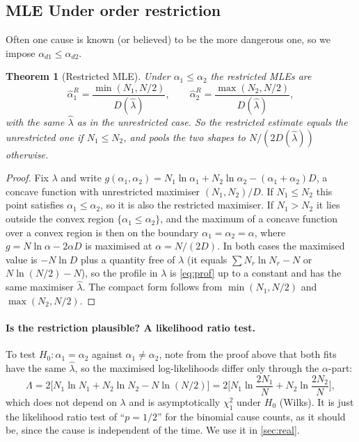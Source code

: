 \documentclass[a4paper,11pt]{article}
\newtheorem{theorem}{Theorem}[section]
\begin{document}
\subsection{MLE Under order restriction}
Often one cause is known (or believed) to be the more dangerous one, so we impose $\alpha_{d1}\le\alpha_{d2}$.
\begin{theorem}[Restricted MLE]\label{thm:restr}
Under $\alpha_1\le\alpha_2$ the restricted MLEs are
\[
\hat\alpha_1^{R}=\frac{\min(N_1,N/2)}{D(\hat\lambda)},\qquad \hat\alpha_2^{R}=\frac{\max(N_2,N/2)}{D(\hat\lambda)},
\]
with the same $\hat\lambda$ as in the unrestricted case. So the restricted estimate equals the unrestricted one if $N_1\le N_2$, and pools the two shapes to $N/(2D(\hat\lambda))$ otherwise.
\end{theorem}
\begin{proof}
Fix $\lambda$ and write $g(\alpha_1,\alpha_2)=N_1\ln\alpha_1+N_2\ln\alpha_2-(\alpha_1+\alpha_2)D$, a concave function with unrestricted maximiser $(N_1,N_2)/D$. If $N_1\le N_2$ this point satisfies $\alpha_1\le\alpha_2$, so it is also the restricted maximiser. If $N_1>N_2$ it lies outside the convex region $\{\alpha_1\le\alpha_2\}$, and the maximum of a concave function over a convex region is then on the boundary $\alpha_1=\alpha_2=\alpha$, where $g=N\ln\alpha-2\alpha D$ is maximised at $\alpha=N/(2D)$. In both cases the maximised value is $-N\ln D$ plus a quantity free of $\lambda$ (it equals $\sum N_r\ln N_r-N$ or $N\ln(N/2)-N$), so the profile in $\lambda$ is \eqref{eq:prof} up to a constant and has the same maximiser $\hat\lambda$. The compact form follows from $\min(N_1,N/2)$ and $\max(N_2,N/2)$.
\end{proof}

\paragraph{Is the restriction plausible? A likelihood ratio test.} To test $H_0:\alpha_1=\alpha_2$ against $\alpha_1\ne\alpha_2$, note from the proof above that both fits have the same $\hat\lambda$, so the maximised log-likelihoods differ only through the $\alpha$-part:
\[
\Lambda=2\Big[N_1\ln N_1+N_2\ln N_2-N\ln(N/2)\Big]=2\Big[N_1\ln\frac{2N_1}{N}+N_2\ln\frac{2N_2}{N}\Big],
\]
which does not depend on $\lambda$ and is asymptotically $\chi^2_1$ under $H_0$ (Wilks). It is just the likelihood ratio test of ``$p=1/2$'' for the binomial cause counts, as it should be, since the cause is independent of the time. We use it in \cref{sec:real}.
\end{document}
